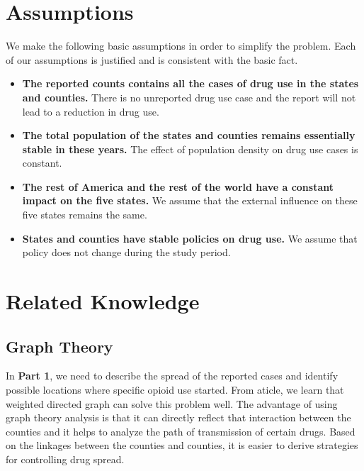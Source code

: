 \documentclass{mcmthesis}
\begin{document}
\section{Assumptions}

We make the following basic assumptions in order to simplify the problem. Each
of our assumptions is justified and is consistent with the basic fact.
\begin{itemize}
	\item \textbf{The reported counts contains all the cases of drug use in the states and counties.} There is no unreported drug use case and the report will not lead to a reduction in drug use.
	\item \textbf{The total population of the states and counties remains essentially stable in these years.} The effect of population density on drug use cases is constant.
	\item \textbf{The rest of America and the rest of the world have a constant impact on the five states.} We assume that the external influence on these five states remains the same.
	\item \textbf{States and counties have stable policies on drug use.} We assume that policy does not change during the study period.
\end{itemize}

\section{Related Knowledge}

\subsection*{Graph Theory}
In \textbf{Part 1}, we need to describe the spread of the reported cases and identify possible locations where specific opioid use started. From aticle\cite{2}, we learn that weighted directed graph can solve this problem well. The advantage of using graph theory analysis is that it can directly reflect that interaction between the counties and it helps to analyze the path of transmission of certain drugs. Based on the linkages between the counties and counties, it is easier to derive strategies for controlling drug spread.
\end{document}
